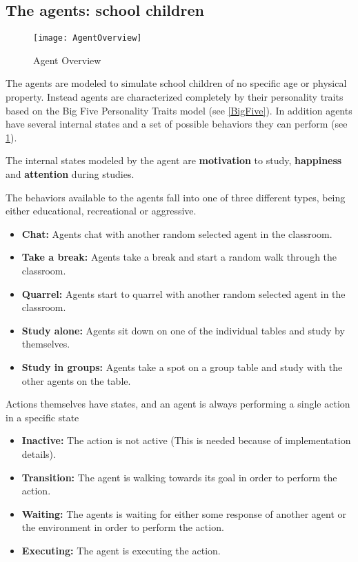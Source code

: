 \subsection{The agents: school children}

\begin{figure}[]
    \centering
    \texttt{[image: AgentOverview]}
    \caption{Agent Overview}
    \label{AgentOverview}
\end{figure}

The agents are modeled to simulate school children of no specific age or physical
property. Instead agents are characterized completely by their personality traits
based on the Big Five Personality Traits model (see \ref{BigFive}). In addition
agents have several internal states and a set of possible behaviors they can perform (see \ref{AgentOverview}).

The internal states modeled by the agent are \textbf{motivation} to study, \textbf{happiness}
and \textbf{attention} during studies.

The behaviors available to the agents fall into one of three different types, being
either educational, recreational or aggressive.

\begin{itemize}
    \item \textbf{Chat:} Agents chat with another random selected agent in the classroom.
    \item \textbf{Take a break:} Agents take a break and start a random walk through the classroom.
    \item \textbf{Quarrel:} Agents start to quarrel with another random selected agent in the classroom.
    \item \textbf{Study alone:} Agents sit down on one of the individual tables and study by themselves.
    \item \textbf{Study in groups:} Agents take a spot on a group table and study with the other agents on the table.
\end{itemize}

Actions themselves have states, and an agent is always performing a single action
in a specific state

\begin{itemize}
    \item \textbf{Inactive:} The action is not active (This is needed because of implementation details). 
    \item \textbf{Transition:} The agent is walking towards its goal in order to perform the action.
    \item \textbf{Waiting:} The agents is waiting for either some response of another agent or the environment in order to perform the action.
    \item \textbf{Executing:} The agent is executing the action.
\end{itemize}

